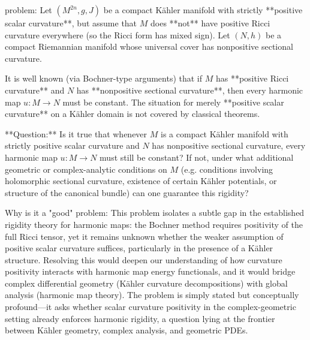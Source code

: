 problem:  
Let \((M^{2n}, g, J)\) be a compact Kähler manifold with strictly **positive scalar curvature**, but assume that \(M\) does **not** have positive Ricci curvature everywhere (so the Ricci form has mixed sign). Let \((N,h)\) be a compact Riemannian manifold whose universal cover has nonpositive sectional curvature.  

It is well known (via Bochner-type arguments) that if \(M\) has **positive Ricci curvature** and \(N\) has **nonpositive sectional curvature**, then every harmonic map \(u:M\to N\) must be constant. The situation for merely **positive scalar curvature** on a Kähler domain is not covered by classical theorems.  

**Question:**  
Is it true that whenever \(M\) is a compact Kähler manifold with strictly positive scalar curvature and \(N\) has nonpositive sectional curvature, every harmonic map \(u:M\to N\) must still be constant?  
If not, under what additional geometric or complex-analytic conditions on \(M\) (e.g. conditions involving holomorphic sectional curvature, existence of certain Kähler potentials, or structure of the canonical bundle) can one guarantee this rigidity?  

Why is it a "good" problem:  
This problem isolates a subtle gap in the established rigidity theory for harmonic maps: the Bochner method requires positivity of the full Ricci tensor, yet it remains unknown whether the weaker assumption of positive scalar curvature suffices, particularly in the presence of a Kähler structure. Resolving this would deepen our understanding of how curvature positivity interacts with harmonic map energy functionals, and it would bridge complex differential geometry (Kähler curvature decompositions) with global analysis (harmonic map theory). The problem is simply stated but conceptually profound—it asks whether scalar curvature positivity in the complex-geometric setting already enforces harmonic rigidity, a question lying at the frontier between Kähler geometry, complex analysis, and geometric PDEs.